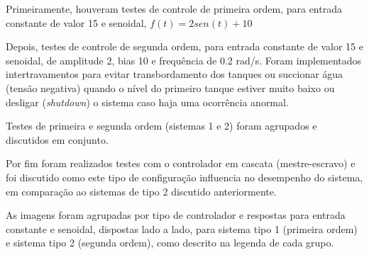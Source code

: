 %
%
Primeiramente, houveram testes de controle de primeira ordem, para entrada constante de valor 15 e senoidal,
$f(t)= 2sen(t)+10$

Depois, testes de controle de segunda ordem, para entrada constante de valor 15 e senoidal, de amplitude 2, bias 10 e frequência de 0.2 rad/s. Foram implementados intertravamentos para evitar transbordamento dos tanques ou succionar água (tensão negativa) quando o nível do primeiro tanque estiver muito baixo ou desligar (\emph{shutdown}) o sistema caso haja uma ocorrência anormal.

Testes de primeira e segunda ordem (sistemas 1 e 2) foram agrupados e discutidos em conjunto.

Por fim foram realizados testes com o controlador em cascata (mestre-escravo) e foi discutido como este tipo de configuração influencia no desempenho do sistema, em comparação ao sistemas de tipo 2 discutido anteriormente.

As imagens foram agrupadas por tipo de controlador e respostas para entrada constante e senoidal, dispostas lado a lado, para sistema tipo 1 (primeira ordem) e sistema tipo 2 (segunda ordem), como descrito na legenda de cada grupo.
\newpage
%
%
% 
% 
% 

% 
% 
% 
% 

% 
% 
\newpage
%
% 

\newpage
%
% 

\newpage
%
% 

\newpage
%
% 
